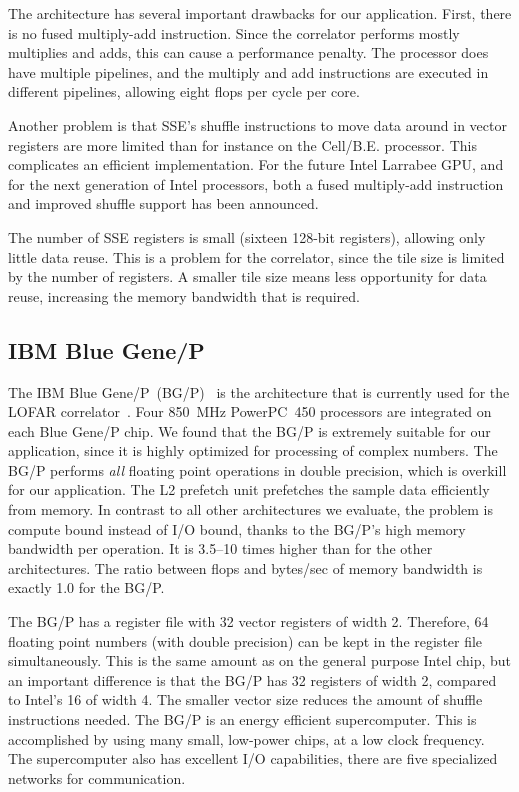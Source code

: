 \documentclass{article}
\begin{document}
The architecture has several
important drawbacks for our application.  First, there is no fused
multiply-add instruction.  Since the correlator performs mostly
multiplies and adds, this can cause a performance penalty. The
processor does have multiple pipelines, and the multiply and add
instructions are executed in different pipelines, allowing eight
flops per cycle per core.

Another problem is that SSE's shuffle instructions
to move data around in vector registers are more limited
than for instance on the \mbox{Cell/B.E.} processor. This complicates an
efficient implementation.
For the future Intel Larrabee GPU, and for the next
generation of Intel processors, both a fused multiply-add instruction
and improved shuffle support has been announced.

The number
of SSE registers is small (sixteen 128-bit registers), allowing only little
data reuse. 
This is a problem for the correlator, since
the tile size is limited by the number of registers.  A smaller tile
size means less opportunity for data reuse, increasing the memory
bandwidth that is required.

\subsection{IBM Blue Gene/P}

The IBM Blue Gene/P~(BG/P)~\cite{bgp} is the architecture that is
currently used for the LOFAR correlator~\cite{spaa-06}.  Four 850~MHz
PowerPC~450 processors are integrated on each Blue Gene/P chip.  We
found that the BG/P is extremely suitable for our application, since
it is highly optimized for processing of complex numbers.  The BG/P
performs \emph{all} floating point operations in double precision, which is
overkill for our application.
The L2 prefetch unit prefetches the sample data efficiently from
memory.  In contrast to all other architectures we evaluate, the
problem is compute bound instead of I/O bound, thanks to the BG/P's high
memory bandwidth per operation. It is 3.5--10 times higher than
for the other architectures.  
The ratio between flops and bytes/sec of
memory bandwidth is exactly 1.0 for the BG/P.

The BG/P has a register file with 32 vector registers of width 2.
Therefore, 64 floating point numbers (with double precision) can be
kept in the register file simultaneously. This is the same amount as
on the general purpose Intel chip, but an important difference is that the
BG/P has 32 registers of width 2, compared to Intel's 16 of width 4.
The smaller vector size reduces the amount of shuffle instructions
needed. 
The BG/P is an energy efficient supercomputer. This is
accomplished by using many small, low-power chips, at a low clock
frequency.  The supercomputer also has excellent I/O capabilities,
there are five specialized networks for communication.
\end{document}
